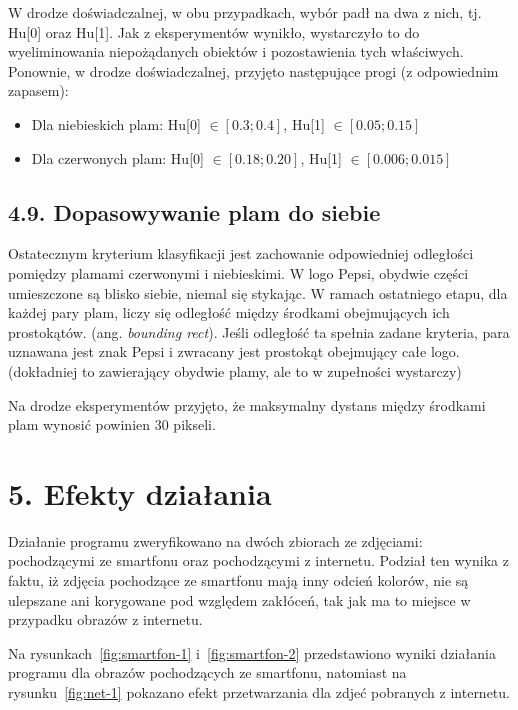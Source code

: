 \documentclass[11pt,a4paper,twoside]{report}
\begin{document}
			W drodze doświadczalnej, w obu przypadkach, wybór padł na dwa z nich, tj. Hu[0] oraz Hu[1]. Jak z eksperymentów wynikło, wystarczyło to do wyeliminowania niepożądanych obiektów i pozostawienia tych właściwych. Ponownie, w drodze doświadczalnej, przyjęto następujące progi (z odpowiednim zapasem):

			\begin{itemize}
				\item Dla niebieskich plam: Hu[0] $\in [0.3; 0.4]$, Hu[1] $\in [0.05; 0.15]$
				\item Dla czerwonych plam: Hu[0] $\in [0.18; 0.20]$, Hu[1] $\in [0.006; 0.015]$
			\end{itemize}

	\subsection*{4.9. Dopasowywanie plam do siebie}

			Ostatecznym kryterium klasyfikacji jest zachowanie odpowiedniej odległości pomiędzy plamami czerwonymi i niebieskimi. W logo Pepsi, obydwie części umieszczone są blisko siebie, niemal się stykając. W ramach ostatniego etapu, dla każdej pary plam, liczy się odległość między środkami obejmujących ich prostokątów. (ang. \emph{bounding rect}). Jeśli odległość ta spełnia zadane kryteria, para uznawana jest znak Pepsi i zwracany jest prostokąt obejmujący całe logo. (dokładniej to zawierający obydwie plamy, ale to w zupełności wystarczy)

			Na drodze eksperymentów przyjęto, że maksymalny dystans między środkami plam wynosić powinien 30 pikseli.

\section*{5. Efekty działania}

	Działanie programu zweryfikowano na dwóch zbiorach ze zdjęciami: pochodzącymi ze smartfonu oraz pochodzącymi z internetu. Podział ten wynika z faktu, iż zdjęcia pochodzące ze smartfonu mają inny odcień kolorów, nie są ulepszane ani korygowane pod względem zakłóceń, tak jak ma to miejsce w przypadku obrazów z internetu.

	Na rysunkach~\ref{fig:smartfon-1} i~\ref{fig:smartfon-2} przedstawiono wyniki działania programu dla obrazów pochodzących ze smartfonu, natomiast na rysunku~\ref{fig:net-1} pokazano efekt przetwarzania dla zdjeć pobranych z internetu.
\end{document}
